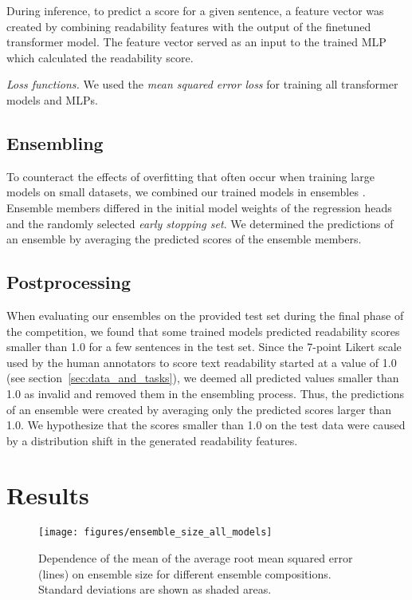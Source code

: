 \documentclass[11pt,a4paper]{article}
\begin{document}
During inference, to predict a score for a given sentence, a feature vector was created by combining readability features with the output of the finetuned transformer model. The feature vector served as an input to the trained MLP which calculated the readability score.

\emph{Loss functions.} We used the \emph{mean squared error loss} for training all transformer models and MLPs.
 
\subsection{Ensembling}
\label{ssec:ensembling}

To counteract the effects of overfitting that often occur when training large models on small datasets, we combined our trained models in ensembles \cite{Risch2020,Bornheim2021}.
Ensemble members differed in the initial model weights of the regression heads and the randomly selected \emph{early stopping set}.
We determined the predictions of an ensemble by averaging the predicted scores of the ensemble members.

\subsection{Postprocessing}
When evaluating our ensembles on the provided test set during the final phase of the competition, we found that some trained models predicted readability scores smaller than 1.0 for a few sentences in the test set.
Since the 7-point Likert scale used by the human annotators to score text readability started at a value of 1.0 (see section~\ref{sec:data_and_tasks}), we deemed all predicted values smaller than 1.0 as invalid and removed them in the ensembling process.
Thus, the predictions of an ensemble were created by averaging only the predicted scores larger than 1.0.
We hypothesize that the scores smaller than 1.0 on the test data were caused by a distribution shift in the generated readability features.
 
\section{Results}

\begin{figure}[t]
    \texttt{[image: figures/ensemble\_size\_all\_models]}
    \caption{Dependence of the mean of the average root mean squared error (lines) on ensemble size for different ensemble compositions. Standard deviations are shown as shaded areas.}
    \label{fig:ensemble}
\end{figure}
\end{document}
